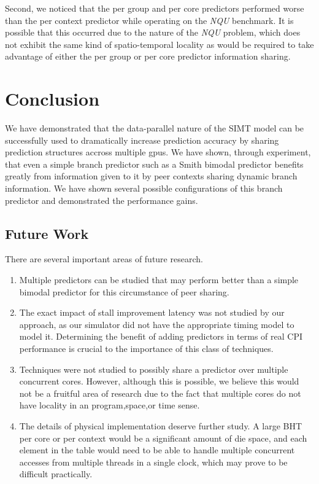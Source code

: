 \documentclass[conference]{IEEEtran}
\begin{document}
Second, we noticed that the per group and per core predictors performed worse than the per context predictor while operating on the \emph{NQU} benchmark.  It is possible that this occurred due to the nature of the \emph{NQU} problem, which does not exhibit the same kind of spatio-temporal locality as would be required to take advantage of either the per group or per core predictor information sharing.

\section{Conclusion}
We have demonstrated that the data-parallel nature of the SIMT model can be successfully used to dramatically increase prediction accuracy by sharing prediction structures accross multiple gpus.  We have shown, through experiment, that even
a simple branch predictor such as a Smith bimodal predictor benefits greatly from information given to it by peer contexts sharing dynamic branch information.  We have shown several possible configurations of this branch predictor and demonstrated the performance gains.

\subsection{Future Work}

There are several important areas of future research.

\begin{enumerate}
 \item Multiple predictors can be studied that may perform better than a simple bimodal predictor for this circumstance of peer sharing.
\item The exact impact of stall improvement latency was not studied by our approach, as our simulator did not have the appropriate timing model to model it.  Determining the 
benefit of adding predictors in terms of real CPI performance is crucial to the importance of this class of techniques.
\item Techniques were not studied to possibly share a predictor over multiple concurrent cores.  However, although this is possible, we believe this would not 
be a fruitful area of research due to the fact that multiple cores do not have locality in an program,space,or time sense.
\item The details of physical implementation deserve further study.  A large BHT per core or per context would be a significant amount of die space, and each
element in the table would need to be able to handle multiple concurrent accesses from multiple threads in a single clock, which may prove to be difficult practically.
\end{enumerate}
\end{document}
